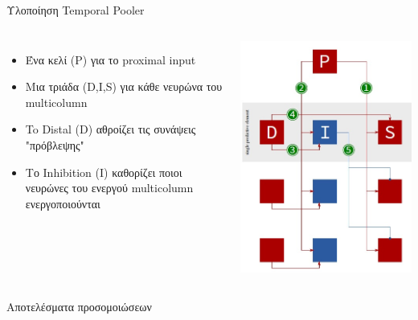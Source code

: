 \documentclass[11pt,center]{beamer}
\begin{document}
	\begin{frame}{Υλοποίηση Temporal Pooler}
		\begin{columns}
			\begin{itemize}
				\item<1->[--] Ένα κελί (P) για το proximal input
				\item<1->[--] Μια τριάδα (D,I,S) για κάθε νευρώνα του multicolumn
				\vspace{1em}
				\item<2->[--] To Distal (D) αθροίζει τις συνάψεις "πρόβλεψης"
				\vspace{1em}
				\item<3->[--] Το Inhibition (I) καθορίζει ποιοι νευρώνες του ενεργού multicolumn 							ενεργοποιούνται
			\end{itemize}

			\includegraphics[width=1 \textwidth,center]{../pics/temporal_hardware.jpg}
		\end{columns}

	\end{frame}

	\begin{frame}{Αποτελέσματα προσομοιώσεων}


	\end{frame}
\end{document}
